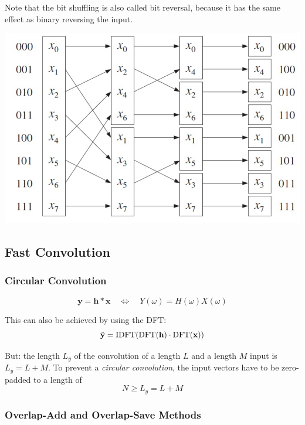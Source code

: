 Note that the bit shuffling is also called bit reversal, because it has
the same effect as binary reversing the input.
\begin{center}
	\includegraphics[width=0.8\linewidth]{images/DFT_FFT_shuffling.jpg}
\end{center}

\subsection{Fast Convolution}
\subsubsection{Circular Convolution}

\begin{equation*}
	\mathbf{y} = \mathbf{h} \ast \mathbf{x} \quad\Leftrightarrow\quad Y(\omega) = H(\omega) X(\omega)
\end{equation*}

This can also be achieved by using the DFT:
\begin{equation*}
	\tilde{\mathbf{y}} = \text{IDFT}(\operatorname{\text{DFT}}(\mathbf{h}) \cdot \operatorname{\text{DFT}}(\mathbf{x}))
\end{equation*}

But: the length $L_y$ of the convolution of a length $L$ and a length $M$
input is $L_y = L + M$. To prevent a \emph{circular convolution}, the
input vectors have to be zero-padded to a length of
\begin{equation*}
	N \geq L_y = L+M
\end{equation*}

\subsubsection{Overlap-Add and Overlap-Save Methods}

